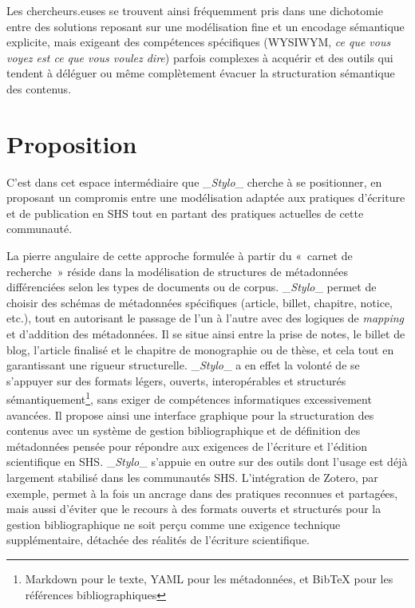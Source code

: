 \documentclass[final, fra]{anthology-ch}      %
\begin{document}
Les chercheurs.euses se trouvent ainsi fréquemment pris dans une
dichotomie entre des solutions reposant sur une modélisation fine et un
encodage sémantique explicite, mais exigeant des compétences spécifiques
(WYSIWYM, \emph{ce que vous voyez est ce que vous voulez dire})
\cite{powerWhatYouSee1998a}
parfois complexes à acquérir et des outils qui tendent à déléguer ou
même complètement évacuer la structuration sémantique des contenus.

\section{Proposition}\label{proposition}

C'est dans cet espace intermédiaire que \_\emph{Stylo}\_ cherche à se
positionner, en proposant un compromis entre une modélisation adaptée
aux pratiques d'écriture et de publication en SHS tout en partant des
pratiques actuelles de cette communauté.

La pierre angulaire de cette approche formulée à partir du «~carnet de
recherche~» réside dans la modélisation de structures de métadonnées
différenciées selon les types de documents ou de corpus.
\_\emph{Stylo}\_ permet de choisir des schémas de métadonnées
spécifiques (article, billet, chapitre, notice, etc.), tout en
autorisant le passage de l'un à l'autre avec des logiques de
\emph{mapping} et d'addition des métadonnées. Il se situe ainsi entre la
prise de notes, le billet de blog, l'article finalisé et le chapitre de
monographie ou de thèse, et cela tout en garantissant une rigueur
structurelle. \_\emph{Stylo}\_ a en effet la volonté de se s'appuyer sur
des formats légers, ouverts, interopérables et structurés
sémantiquement\footnote{Markdown pour le texte, YAML pour les
  métadonnées, et BibTeX pour les références bibliographiques}, sans
exiger de compétences informatiques excessivement avancées. Il propose
ainsi une interface graphique pour la structuration des contenus avec un
système de gestion bibliographique et de définition des métadonnées
pensée pour répondre aux exigences de l'écriture et l'édition
scientifique en SHS. \_\emph{Stylo}\_ s'appuie en outre sur des outils
dont l'usage est déjà largement stabilisé dans les communautés SHS.
L'intégration de Zotero, par exemple, permet à la fois un ancrage dans
des pratiques reconnues et partagées, mais aussi d'éviter que le recours
à des formats ouverts et structurés pour la gestion bibliographique ne
soit perçu comme une exigence technique supplémentaire, détachée des
réalités de l'écriture scientifique.
\end{document}
